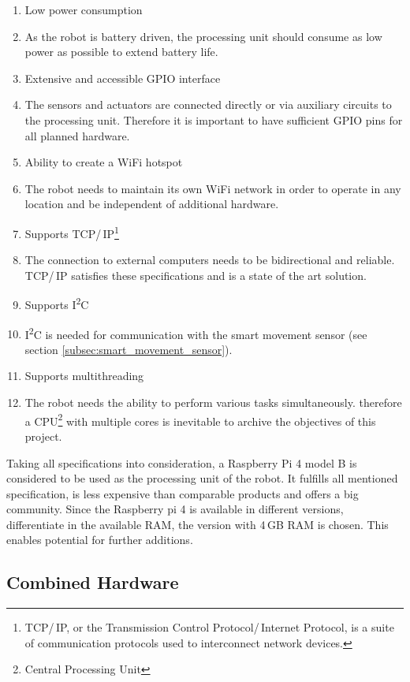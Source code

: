 \begin{enumerate}
\itemsep0em
\item Low power consumption
\item[] As the robot is battery driven, the processing unit should consume as low power as possible to extend battery life.
\item Extensive and accessible GPIO interface
\item[] The sensors and actuators are connected directly or via auxiliary circuits to the processing unit. Therefore it is important to have sufficient GPIO pins for all planned hardware.
\item Ability to create a WiFi hotspot
\item[] The robot needs to maintain its own WiFi network in order to operate in any location and be independent of additional hardware.
\item Supports TCP/\,IP\footnote{TCP/\,IP, or the Transmission Control Protocol/\,Internet Protocol, is a suite of communication protocols used to interconnect network devices.}
\item[] The connection to external computers needs to be bidirectional and reliable. TCP/\,IP satisfies these specifications and is a state of the art solution.
\item Supports I\textsuperscript{2}C
\item[] I\textsuperscript{2}C is needed for communication with the smart movement sensor (see section \ref{subsec:smart_movement_sensor}). 
\item Supports multithreading
\item[] The robot needs the ability to perform various tasks simultaneously. therefore a CPU\footnote{Central Processing Unit} with multiple cores is inevitable to archive the objectives of this project.
\end{enumerate}

Taking all specifications into consideration, a Raspberry Pi 4 model B is considered to be used as the processing unit of the robot. It fulfills all mentioned specification, is less expensive than comparable products and offers a big community. Since the Raspberry pi 4 is available in different versions, differentiate in the available RAM, the version with 4\,GB RAM is chosen. This enables potential for further additions.

\newpage

\subsection{Combined Hardware}

